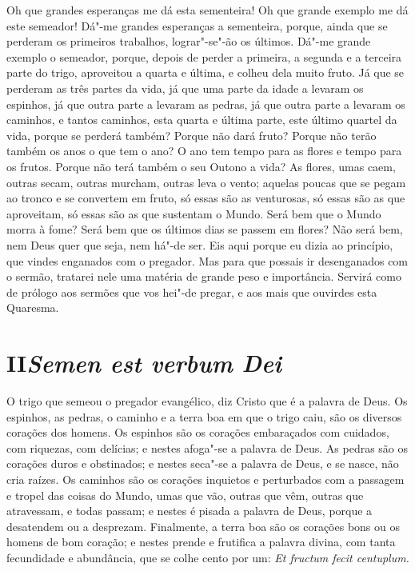 Oh que grandes esperanças me dá esta sementeira! Oh que
grande exemplo me dá este semeador! Dá"-me grandes esperanças a
sementeira, porque, ainda que se perderam os primeiros trabalhos,
lograr"-se"-ão os últimos. Dá"-me grande exemplo o semeador, porque, depois
de perder a primeira, a segunda e a terceira parte do trigo, aproveitou
a quarta e última, e colheu dela muito fruto. Já que se perderam as três
partes da vida, já que uma parte da idade a levaram os espinhos, já que
outra parte a levaram as pedras, já que outra parte a levaram os
caminhos, e tantos caminhos, esta quarta e última parte, este último
quartel da vida, porque se perderá também? Porque não dará fruto?
Porque não terão também os anos o que tem o ano? O ano tem tempo para as
flores e tempo para os
frutos. Porque não terá também o seu Outono a vida? As flores, umas
caem, outras secam, outras murcham, outras leva o vento; aquelas poucas
que se pegam ao tronco e se convertem em fruto, só essas são as
venturosas, só essas são as que aproveitam, só essas são as que
sustentam o Mundo. Será bem que o Mundo morra à fome? Será bem que os
últimos dias se passem em flores? Não será bem, nem Deus quer que
seja, nem há"-de ser. Eis aqui porque eu dizia ao princípio, que vindes
enganados com o pregador. Mas para que possais ir desenganados com o
sermão, tratarei nele uma matéria de grande peso e importância. Servirá
como de prólogo aos sermões que vos hei"-de pregar, e aos mais que
ouvirdes esta Quaresma.

\section{II\break\textit{Semen est verbum Dei}}


O trigo que semeou o pregador evangélico, diz Cristo que é a palavra
de Deus. Os espinhos, as pedras, o caminho e a terra boa em que o trigo
caiu, são os diversos corações dos homens. Os espinhos são os corações
embaraçados com cuidados, com riquezas, com delícias; e nestes
afoga"-se a palavra de Deus. As pedras são os corações duros e
obstinados; e nestes seca"-se a palavra de Deus, e se nasce, não cria
raízes. Os caminhos são os corações inquietos e perturbados com a
passagem e tropel das coisas do Mundo, umas que vão, outras que vêm,
outras que atravessam, e todas passam; e nestes é pisada a palavra de
Deus, porque a desatendem ou a desprezam. Finalmente, a terra boa são
os corações bons ou os homens de bom coração; e nestes prende e
frutifica a palavra divina, com tanta fecundidade e abundância, que se
colhe cento por um: \emph{Et fructum fecit centuplum.}

